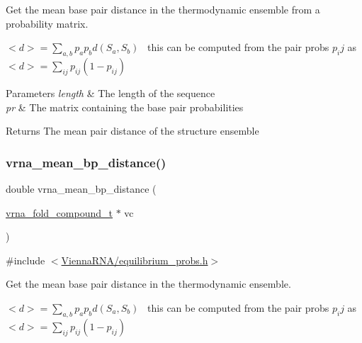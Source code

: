 Get the mean base pair distance in the thermodynamic ensemble from a probability matrix. 

$<d> = \sum_{a,b} p_a p_b d(S_a,S_b)$~\newline
this can be computed from the pair probs $p_ij$ as~\newline
 $<d> = \sum_{ij} p_{ij}(1-p_{ij})$


\begin{DoxyParams}{Parameters}
{\em length} & The length of the sequence \\
\hline
{\em pr} & The matrix containing the base pair probabilities \\
\hline
\end{DoxyParams}
\begin{DoxyReturn}{Returns}
The mean pair distance of the structure ensemble 
\end{DoxyReturn}
\mbox{\label{group__pf__fold_gaa6b8983b559b9ef4b2e1b31113ea317b}} 
\subsubsection{\texorpdfstring{vrna\+\_\+mean\+\_\+bp\+\_\+distance()}{vrna\_mean\_bp\_distance()}}
{\footnotesize\ttfamily double vrna\+\_\+mean\+\_\+bp\+\_\+distance (\begin{DoxyParamCaption}\item[{\mbox{\hyperlink{group__fold__compound_ga1b0cef17fd40466cef5968eaeeff6166}{vrna\+\_\+fold\+\_\+compound\+\_\+t}} $\ast$}]{vc }\end{DoxyParamCaption})}



{\ttfamily \#include $<$\mbox{\hyperlink{equilibrium__probs_8h}{Vienna\+R\+N\+A/equilibrium\+\_\+probs.\+h}}$>$}



Get the mean base pair distance in the thermodynamic ensemble. 

$<d> = \sum_{a,b} p_a p_b d(S_a,S_b)$~\newline
this can be computed from the pair probs $p_ij$ as~\newline
 $<d> = \sum_{ij} p_{ij}(1-p_{ij})$


